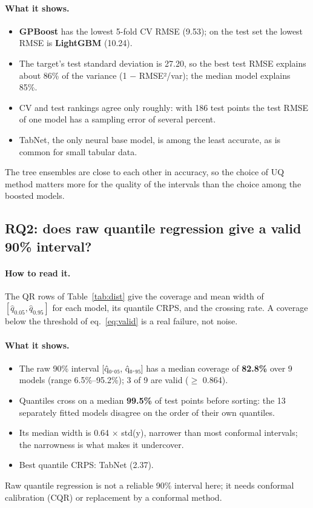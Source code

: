 \documentclass[11pt]{article}
\begin{document}
\paragraph{What it shows.}
\begin{itemize}
\item \textbf{GPBoost} has the lowest 5-fold CV RMSE (9.53); on the test set the lowest RMSE is \textbf{LightGBM} (10.24).
\item The target's test standard deviation is 27.20, so the best test RMSE explains about 86\% of the variance (1 $-$ RMSE²/var); the median model explains 85\%.
\item CV and test rankings agree only roughly: with 186 test points the test RMSE of one model has a sampling error of several percent.
\item TabNet, the only neural base model, is among the least accurate, as is common for small tabular data.
\end{itemize}
\begin{insight}[Takeaway RQ1]
The tree ensembles are close to each other in accuracy, so the choice of UQ method matters more for the quality of the intervals than the choice among the boosted models.
\end{insight}

\subsection{RQ2: does raw quantile regression give a valid 90\% interval?}
\paragraph{How to read it.} The QR rows of Table~\ref{tab:dist} give the coverage and mean width of $[\hat q_{0.05},\hat q_{0.95}]$ for each model, its quantile CRPS, and the crossing rate. A coverage below the threshold of eq.~\eqref{eq:valid} is a real failure, not noise.
\paragraph{What it shows.}
\begin{itemize}
\item The raw 90\% interval [q̂₀.₀₅, q̂₀.₉₅] has a median coverage of \textbf{82.8\%} over 9 models (range 6.5\%--95.2\%); 3 of 9 are valid ($\geq$ 0.864).
\item Quantiles cross on a median \textbf{99.5\%} of test points before sorting: the 13 separately fitted models disagree on the order of their own quantiles.
\item Its median width is 0.64 $\times$ std(y), narrower than most conformal intervals; the narrowness is what makes it undercover.
\item Best quantile CRPS: TabNet (2.37).
\end{itemize}
\begin{insight}[Takeaway RQ2]
Raw quantile regression is not a reliable 90\% interval here; it needs conformal calibration (CQR) or replacement by a conformal method.
\end{insight}
\end{document}
